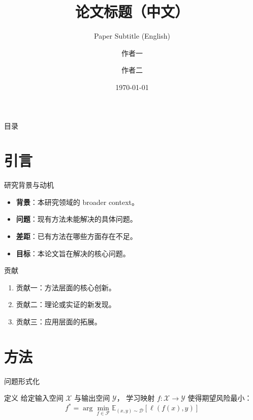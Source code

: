 \documentclass[aspectratio=169,11pt]{beamer}
\title{论文标题（中文）}
\subtitle{Paper Subtitle (English)}
\author{作者一 \and 作者二}
\institute{所在单位 / 院系}
\date{\today}
\begin{document}
\begin{frame}[plain]
  \titlepage
\end{frame}

\begin{frame}{目录}
  \tableofcontents
\end{frame}

\section{引言}

\begin{frame}{研究背景与动机}
  \begin{itemize}
    \item \textbf{背景}：本研究领域的 broader context。
    \item \textbf{问题}：现有方法未能解决的具体问题。
    \item \textbf{差距}：已有方法在哪些方面存在不足。
    \item \textbf{目标}：本论文旨在解决的核心问题。
  \end{itemize}
\end{frame}

\begin{frame}{贡献}
  \begin{enumerate}
    \item \alert{贡献一}：方法层面的核心创新。
    \item \alert{贡献二}：理论或实证的新发现。
    \item \alert{贡献三}：应用层面的拓展。
  \end{enumerate}
\end{frame}

\section{方法}

\begin{frame}{问题形式化}
  \begin{block}{定义}
    给定输入空间 $\mathcal{X}$ 与输出空间 $\mathcal{Y}$，
    学习映射 $f: \mathcal{X} \rightarrow \mathcal{Y}$ 使得期望风险最小：
    \[
      f^* = \arg\min_{f \in \mathcal{F}} \mathbb{E}_{(x,y) \sim \mathcal{D}}
            \left[ \ell(f(x), y) \right]
    \]
  \end{block}
\end{frame}
\end{document}
